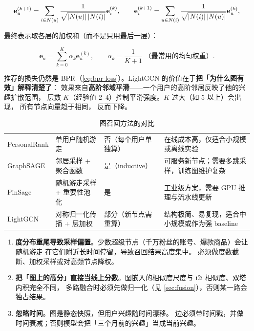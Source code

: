 \begin{equation}
\mathbf{e}_u^{(k+1)} = \sum_{i \in N(u)} \frac{1}{\sqrt{\left\lvert N(u) \right\rvert \left\lvert N(i) \right\rvert}} \mathbf{e}_i^{(k)} ,
\qquad
\mathbf{e}_i^{(k+1)} = \sum_{u \in N(i)} \frac{1}{\sqrt{\left\lvert N(i) \right\rvert \left\lvert N(u) \right\rvert}} \mathbf{e}_u^{(k)} ,
\label{eq:lightgcn}
\end{equation}

最终表示取各层的加权和（而不是只用最后一层）：

\begin{equation}
\mathbf{e}_u = \sum_{k=0}^{K} \alpha_k \mathbf{e}_u^{(k)} ,
\qquad \alpha_k = \frac{1}{K+1} \; \text{（最常用的均匀权重）} .
\label{eq:lightgcn-layer}
\end{equation}

推荐的损失仍然是 BPR（\cref{eq:bpr-loss}）。LightGCN 的价值在于\textbf{把「为什么图有效」解释清楚了}：
效果来自\textbf{高阶邻域平滑}——一个用户的高阶邻居反映了他的兴趣扩散范围，
层数 $K$（经验值 2--4）控制平滑强度。$K$ 过大（如 5 以上）会出现，
所有节点向量趋于相同， 反而下降。

\begin{table}[htbp]
\centering
\caption{图召回方法的对比}
\label{tab:graph-recall}
\small
\begin{tabularx}{\textwidth}{L{2.3cm} L{2.6cm} L{2.0cm} Y}
\toprule
{} &  &  &  \\
\midrule
PersonalRank & 单用户随机游走 & 否（每个用户单独算） & 在线成本高，仅适合小规模或离线实验 \\
GraphSAGE & 邻居采样 + 聚合函数 & 是（inductive） & 可服务新节点；需要多跳采样，训练图维护复杂 \\
PinSage & 随机游走采样 + 重要性池化 & 是 & 工业级方案，需要 GPU 推理与流水线更新 \\
LightGCN & 对称归一化传播 + 层加权 & 部分（新节点需重算） & 结构极简、易复现，适合中小规模或作为强 baseline \\
\bottomrule
\end{tabularx}
\end{table}

\begin{pitfall}[图召回的三个落地陷阱]
\begin{enumerate}
  \item \textbf{度分布重尾导致采样偏置}。少数超级节点（千万粉丝的账号、爆款商品）会让随机游走
        在它们附近长时间停留，导致召回结果高度集中。
        必须做度数截断、加权采样或对高频节点降权。
  \item \textbf{把「图上的高分」直接当线上分数}。图嵌入的相似度尺度与 i2i 相似度、双塔内积完全不同，
        多路融合时必须先做归一化（见 \cref{sec:fusion}），否则某一路会独占结果。
  \item \textbf{忽略时间}。图是静态快照，但用户兴趣随时间漂移。
        边必须带时间戳，并做时间衰减；否则模型会把「三个月前的兴趣」当成当前兴趣。
\end{enumerate}
\end{pitfall}

